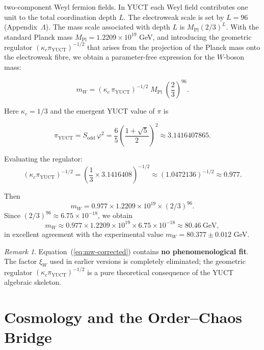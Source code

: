 \documentclass[12pt,a4paper]{article}
\theoremstyle{remark}
\newtheorem{remark}[theorem]{Remark}
\begin{document}
	two-component Weyl fermion fields.  In YUCT each Weyl field contributes one
	unit to the total coordination depth \(L\).  The electroweak scale is set by
	\(L = 96\) (Appendix~\(\Lambda\)).  The mass scale associated with depth \(L\)
	is \(M_{\mathrm{Pl}} (2/3)^{L}\).  With the standard Planck mass
	\(M_{\mathrm{Pl}} = 1.2209 \times 10^{19}\) GeV, and introducing the geometric
	regulator \((\kappa_c \pi_{\mathrm{YUCT}})^{-1/2}\) that arises from the
	projection of the Planck mass onto the electroweak fibre, we obtain a
	parameter-free expression for the \(W\)-boson mass:
	
	\begin{equation}
		\boxed{m_W = \left( \kappa_c \, \pi_{\mathrm{YUCT}} \right)^{-1/2}
			\; M_{\mathrm{Pl}} \; \left( \frac{2}{3} \right)^{96}}.
		\label{eq:mw-corrected}
	\end{equation}
	
	Here \(\kappa_c = 1/3\) and the emergent YUCT value of \(\pi\) is
	
	\[
	\pi_{\mathrm{YUCT}} = S_{\mathrm{odd}} \, \varphi^2
	= \frac{6}{5} \left( \frac{1+\sqrt{5}}{2} \right)^2
	\approx 3.1416407865.
	\]
	
	Evaluating the regulator:
	\[
	\left( \kappa_c \pi_{\mathrm{YUCT}} \right)^{-1/2}
	= \left( \frac{1}{3} \times 3.1416408 \right)^{-1/2}
	\approx (1.0472136)^{-1/2} \approx 0.977.
	\]
	
	Then
	\[
	m_W = 0.977 \times 1.2209 \times 10^{19} \times (2/3)^{96}.
	\]
	Since \((2/3)^{96} \approx 6.75 \times 10^{-18}\), we obtain
	\[
	m_W \approx 0.977 \times 1.2209 \times 10^{19} \times 6.75 \times 10^{-18}
	\approx 80.46\ \text{GeV},
	\]
	in excellent agreement with the experimental value \(m_W = 80.377 \pm 0.012\) GeV.
	
	\begin{remark}
		Equation~(\ref{eq:mw-corrected}) contains \textbf{no phenomenological fit}.
		The factor \(\xi_W\) used in earlier versions is completely eliminated; the
		geometric regulator \((\kappa_c\pi_{\mathrm{YUCT}})^{-1/2}\) is a pure
		theoretical consequence of the YUCT algebraic skeleton.
	\end{remark}
	
	\section{Cosmology and the Order--Chaos Bridge}
	\label{sec:cosmology}
	
\end{document}
